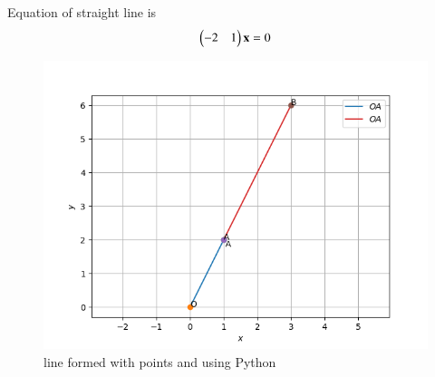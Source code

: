 \documentclass[journal,12pt,twocolumn]{IEEEtran}
\begin{document}
    Equation of straight line is 
\begin{align}
    \begin{pmatrix}-2&1\end{pmatrix} \mathbf{x}=0 
\end{align}
\begin{figure}[H]
\centering
\includegraphics[width=\columnwidth]{Figure_1.png}
\caption{line formed with points  and  using Python}
\label{fig:1}
\end{figure}
\end{document}

